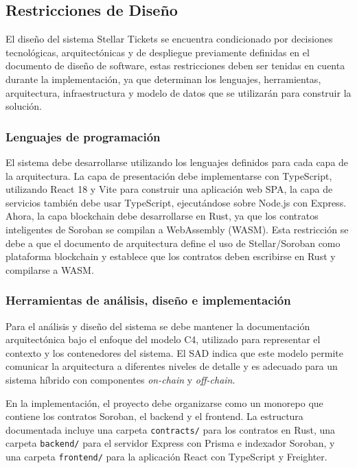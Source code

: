 \documentclass[12pt,letterpaper]{article}
\begin{document}
\subsection{Restricciones de Diseño}
El diseño del sistema Stellar Tickets se encuentra condicionado por decisiones tecnológicas, arquitectónicas y de despliegue previamente definidas en el documento de diseño de software, estas restricciones deben ser tenidas en cuenta durante la implementación, ya que determinan los lenguajes, herramientas, arquitectura, infraestructura y modelo de datos que se utilizarán para construir la solución.

\subsubsection{Lenguajes de programación}
El sistema debe desarrollarse utilizando los lenguajes definidos para cada capa de la arquitectura. La capa de presentación debe implementarse con TypeScript, utilizando React 18 y Vite para construir una aplicación web SPA, la capa de servicios también debe usar TypeScript, ejecutándose sobre Node.js con Express. Ahora, la capa blockchain debe desarrollarse en Rust, ya que los contratos inteligentes de Soroban se compilan a WebAssembly (WASM). Esta restricción se debe a que el documento de arquitectura define el uso de Stellar/Soroban como plataforma blockchain y establece que los contratos deben escribirse en Rust y compilarse a WASM.

\subsubsection{Herramientas de análisis, diseño e implementación}
Para el análisis y diseño del sistema se debe mantener la documentación
arquitectónica bajo el enfoque del modelo C4, utilizado para representar el
contexto y los contenedores del sistema. El SAD indica que este modelo permite
comunicar la arquitectura a diferentes niveles de detalle y es adecuado para un
sistema híbrido con componentes \textit{on-chain} y \textit{off-chain}.

En la implementación, el proyecto debe organizarse como un monorepo que contiene
los contratos Soroban, el backend y el frontend. La estructura documentada
incluye una carpeta \texttt{contracts/} para los contratos en Rust, una carpeta
\texttt{backend/} para el servidor Express con Prisma e indexador Soroban, y una
carpeta \texttt{frontend/} para la aplicación React con TypeScript y Freighter.
\end{document}
